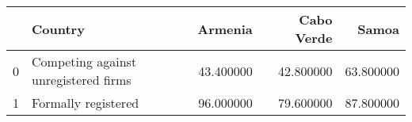 \begin{tabular}{llrrr}
\toprule
 & Country & Armenia & Cabo Verde & Samoa \\
\midrule
0 & Competing against unregistered firms & 43.400000 & 42.800000 & 63.800000 \\
1 & Formally registered & 96.000000 & 79.600000 & 87.800000 \\
\bottomrule
\end{tabular}
